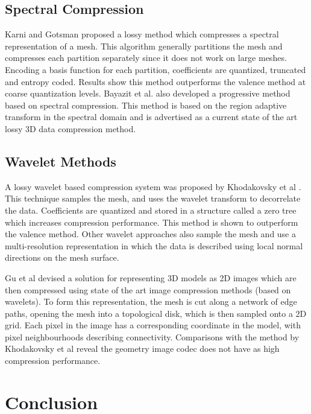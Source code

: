 \subsection{Spectral Compression}

Karni and Gotsman \cite{Karni00Spectral} proposed a lossy method which compresses a spectral representation of a mesh. This algorithm generally partitions the mesh and compresses each partition separately since it does not work on large meshes. Encoding a basis function for each partition, coefficients are quantized, truncated and entropy coded. Results show this method outperforms the valence method \cite{touma98triangle} at coarse quantization levels. Bayazit et al. \cite{Bayazit103DMesh} also developed a progressive method based on spectral compression. This method is based on the region adaptive transform in the spectral domain and is advertised as a current state of the art lossy 3D data compression method. \\

\subsection{Wavelet Methods}

A lossy wavelet based compression system was proposed by Khodakovsky et al \cite{Khodakovsky00Progressive}. This technique samples the mesh, and uses the wavelet transform to decorrelate the data. Coefficients are quantized and stored in a structure called a zero tree which increases compression performance. This method is shown to outperform the valence method. Other wavelet approaches \cite{Guskov00Normal,Khodakovsky04Normalmesh} also sample the mesh and use a multi-resolution representation in which the data is described using local normal directions on the mesh surface.

Gu et al \cite{Gu02Geometry} devised a solution for representing 3D models as 2D images which are then compressed using state of the art image compression methods (based on wavelets). To form this representation, the mesh is cut along a network of edge paths, opening the mesh into a topological disk, which is then sampled onto a 2D grid. Each pixel in the image has a corresponding coordinate in the model, with pixel neighbourhoods describing connectivity. Comparisons with the method by Khodakovsky et al reveal the geometry image codec does not have as high compression performance.



\section{Conclusion}

